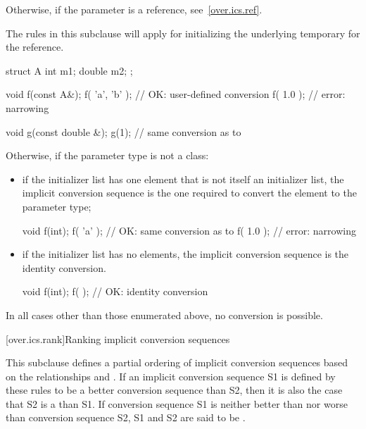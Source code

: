 \pnum
Otherwise, if the parameter is a reference, see~\ref{over.ics.ref}.
\begin{note}
The rules in this subclause will apply for initializing the underlying temporary
for the reference.
\end{note}
\begin{example}
\begin{codeblock}
struct A {
  int m1;
  double m2;
};

void f(const A&);
f( {'a', 'b'} );        // OK:  user-defined conversion
f( {1.0} );             // error: narrowing

void g(const double &);
g({1});                 // same conversion as  to 
\end{codeblock}
\end{example}

\pnum
Otherwise, if the parameter type is not a class:
\begin{itemize}
\item if the initializer list has one element that is not itself an initializer list,
the implicit conversion sequence is the one required to convert the element to
the parameter type;
\begin{example}
\begin{codeblock}
void f(int);
f( {'a'} );             // OK: same conversion as  to 
f( {1.0} );             // error: narrowing
\end{codeblock}
\end{example}

\item if the initializer list has no elements, the implicit conversion sequence
is the identity conversion.
\begin{example}
\begin{codeblock}
void f(int);
f( { } );               // OK: identity conversion
\end{codeblock}
\end{example}
\end{itemize}

\pnum
In all cases other than those enumerated above, no conversion is possible.

[over.ics.rank]{Ranking implicit conversion sequences}

\pnum
This subclause defines a partial ordering of implicit conversion
sequences based on the relationships
and
.
If an implicit conversion sequence S1 is
defined by these rules to be a better conversion sequence than
S2, then it is also the case that S2 is a
than S1.
If conversion sequence S1 is neither better
than nor worse than conversion sequence S2, S1 and S2 are said to
be
.

